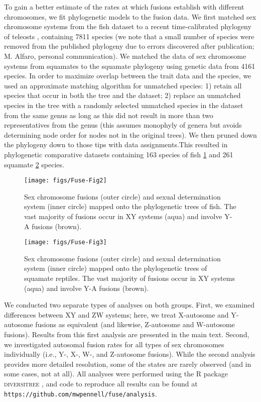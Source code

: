 To gain a better estimate of the rates at which fusions establish with different chromosomes, we fit phylogenetic models to the fusion data. We first matched sex chromosome systems from the fish dataset to a recent time-calibrated phylogeny of teleosts \citep{Rabosky2013}, containing 7811 species (we note that a small number of species were removed from the published phylogeny due to errors discovered after publication; M. Alfaro, personal communication). We matched the data of sex chromosome systems from squamates to the squamate phylogeny \citep{Pyron2013, PyronBurbrink2014} using genetic data from 4161 species. In order to maximize overlap between the trait data and the species, we used an approximate matching algorithm for unmatched species: 1) retain all species that occur in both the tree and the dataset; 2) replace an unmatched species in the tree with a randomly selected unmatched species in the dataset from the same genus as long as this did not result in more than two representatives from the genus (this assumes monophyly of genera but avoids determining node order for nodes not in the original trees). We then pruned down the phylogeny down to those tips with data assignments.This resulted in phylogenetic comparative datasets containing 163 species of fish \ref{fig:phylo-fish} and 261 squamate \ref{fig:phylo-squa} species.

\begin{figure}
\centering
\texttt{[image: figs/Fuse-Fig2]}
\caption[Phylogenetic distribution of sex chromosome fusions in fish]{Sex chromosome fusions (outer circle) and sexual determination system (inner circle) mapped onto the phylogenetic trees of fish. The vast majority of fusions occur in XY systems (aqua) and involve Y-A fusions (brown).}
\label{fig:phylo-fish}
\end{figure}

\begin{figure}
\centering
\texttt{[image: figs/Fuse-Fig3]}
\caption[Phylogenetic distribution of sex chromosome fusions in squamates]{Sex chromosome fusions (outer circle) and sexual determination system (inner circle) mapped onto the phylogenetic trees of squamate reptiles. The vast majority of fusions occur in XY systems (aqua) and involve Y-A fusions (brown).}
\label{fig:phylo-squa}
\end{figure}



We conducted two separate types of analyses on both groups. First, we examined differences between XY and ZW systems; here, we treat X-autosome and Y-autosome fusions as equivalent (and likewise, Z-autosome and W-autosome fusions). Results from this first analysis are presented in the main text. Second, we investigated autosomal fusion rates for all types of sex chromosomes individually (i.e., Y-, X-, W-, and Z-autosome fusions). While the second analysis provides more detailed resolution, some of the states are rarely observed (and in some cases, not at all). All analyses were performed using the R package \textsc{diversitree} \citep{FitzJohn2012}, and code to reproduce all results can be found at \texttt{https://github.com/mwpennell/fuse/analysis}. 

